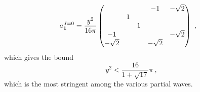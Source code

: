 \documentclass[a4paper,11pt]{article}
\newcommand{\be}{\begin{equation}}
\newcommand{\ee}{\end{equation}}
\begin{document}
\begin{align}
a^{J=0}_{{\bf 1}}& =\frac{y^2}{16\pi} 
\begin{pmatrix}
& & &-1 &-\sqrt{2} \\
& 1& & & \\
& & 1& & \\
-1& & & & -\sqrt{2}\\
-\sqrt 2 & & & -\sqrt 2 & \\
\end{pmatrix} \ , 
\end{align}
which gives the bound
\be
y^2 <  \frac{16}{1+\sqrt {17}}\pi \ ,
\ee
which is the most stringent among the various partial waves.





\clearpage\newpage

{\footnotesize
}
\end{document}
